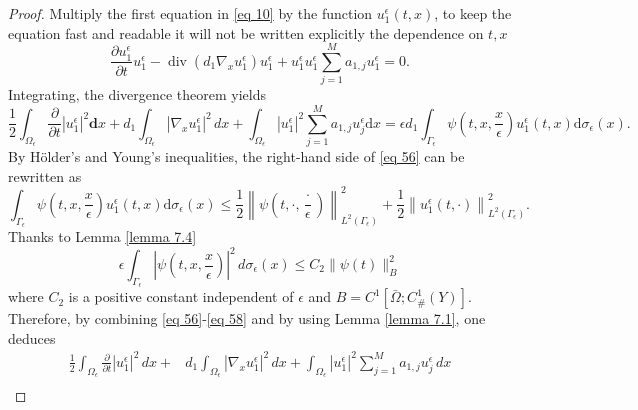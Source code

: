 \begin{proof}
Multiply the first equation in \eqref{eq 10} by the function $u_{1}^{\epsilon}(t, x)$, to keep the equation fast and readable it will not be written explicitly the dependence on $t,x$
$$
\frac{\partial u_{1}^{\epsilon}}{\partial t}u_{1}^{\epsilon}-\operatorname{div}\left(d_{1} \nabla_{x} u_{1}^{\epsilon}\right)u_{1}^{\epsilon}+u_{1}^{\epsilon}u_{1}^{\epsilon} \sum_{j=1}^{M} a_{1, j} u_{1}^{\epsilon}=0.
$$
Integrating, the divergence theorem yields
\begin{equation}
\frac{1}{2}\int_{\Omega_{\epsilon}} \frac{\partial}{\partial t}\left|u_{1}^{\epsilon}\right|^{2} \mathbf{d} x+ d_{1} \int_{\Omega_{\epsilon}}\left|\nabla_{x} u_{1}^{\epsilon}\right|^{2} \, d  x+\int_{\Omega_{\epsilon}}\left|u_{1}^{\epsilon}\right|^{2} \sum_{j=1}^{M} a_{1, j} u_{j}^{\epsilon} \mathrm{d} x =\epsilon d_{1} \int_{\Gamma_{\epsilon}} \psi\left(t, x, \frac{x}{\epsilon}\right) u_{1}^{\epsilon}(t, x) \mathrm{d} \sigma_{\epsilon}(x).
\label{eq 56}\end{equation}
By Hölder's and Young's inequalities, the right-hand side of \eqref{eq 56} can be rewritten as
\begin{equation}
  \int_{\Gamma_{\epsilon}} \psi\left(t, x, \frac{x}{\epsilon}\right) u_{1}^{\epsilon}(t, x) \mathrm{d} \sigma_{\epsilon}(x) \leq \frac{1}{2}\left\|\psi\left(t, \cdot, \frac{\cdot}{\epsilon}\right)\right\|_{L^{2}\left(\Gamma_{\epsilon}\right)}^{2}+\frac{1}{2}\left\|u_{1}^{\epsilon}(t, \cdot)\right\|_{L^{2}\left(\Gamma_{\epsilon}\right)}^{2}.
\label{eq 57}\end{equation}
Thanks to Lemma \eqref{lemma 7.4}
\begin{equation}
  \epsilon \int_{\Gamma_{\epsilon}}\left|\psi\left(t, x, \frac{x}{\epsilon}\right)\right|^{2} \, d  \sigma_{\epsilon}(x) \leq C_{2}\|\psi(t)\|_{B}^{2}
\label{eq 58}\end{equation}
where $C_{2}$ is a positive constant independent of $\epsilon$ and $B=C^{1}\left[\bar{\Omega} ; C_{\#}^{1}(Y)\right]$. Therefore, by combining \eqref{eq 56}-\eqref{eq 58} and by using Lemma \eqref{lemma 7.1}, one deduces
\begin{equation*}
\begin{aligned}
    \frac{1}{2} \int_{\Omega_{\epsilon}} \frac{\partial}{\partial t}\left|u_{1}^{\epsilon}\right|^{2} \, {d} x+& d_{1} \int_{\Omega_{\epsilon}}\left|\nabla_{x} u_{1}^{\epsilon}\right|^{2} \, {d} x+\int_{\Omega_{\epsilon}}\left|u_{1}^{\epsilon}\right|^{2} \sum_{j=1}^{M} a_{1, j} u_{j}^{\epsilon} \, {d} x\\

\end{aligned}
\end{equation*}
\end{proof}
